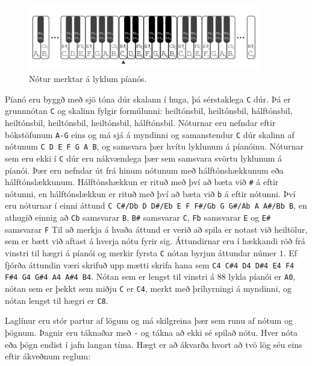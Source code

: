 \begin{figure}[ht!]
  \centering
    \includegraphics[width=0.9\textwidth]{piano}
  \caption{Nótur merktar á lyklum píanós.}
\end{figure}

Píanó eru byggð með sjö tóna dúr skalann í huga, þá sérstaklega \texttt{C} dúr.
Þá er grunnnótan \texttt{C} og skalinn fylgir formúlunni:
heiltónsbil, heiltónsbil, hálftónsbil, heiltónsbil, heiltónsbil, heiltónsbil, hálftónsbil.
Nóturnar eru nefndar eftir bókstöfunum \texttt{A-G} eins og má sjá á myndinni og samanstendur \texttt{C} dúr skalinn af nótunum \texttt{C D E F G A B}, og samsvara þær hvítu lyklunum á píanóinu.
Nóturnar sem eru ekki í \texttt{C} dúr eru nákvæmlega þær sem samsvara svörtu lyklunum á píanói.
Þær eru nefndar út frá hinum nótunum með hálftónshækkunum eða hálftónslækkunum.
Hálftónshækkun er rituð með því að bæta við \texttt{\#} á eftir nótunni, en hálftónslækkun er rituð með því að bæta við \texttt{b} á eftir nótunni.
Því eru nóturnar í einni áttund \texttt{C C\#/Db D D\#/Eb E F F\#/Gb G G\#/Ab A A\#/Bb B}, en athugið einnig að \texttt{Cb} samsvarar \texttt{B}, \texttt{B\#} samsvarar \texttt{C}, \texttt{Fb} samsvarar \texttt{E} og \texttt{E\#} samsvarar \texttt{F}
Til að merkja á hvaða áttund er verið að spila er notast við heiltölur, sem er bætt við aftast á hverja nótu fyrir sig.
Áttundirnar eru í hækkandi röð frá vinstri til hægri á píanói og merkir fyrsta \texttt{C} nótan byrjun áttundar númer $1$.
Ef fjórða áttundin væri skrifuð upp mætti skrifa hana sem \texttt{C4 C\#4 D4 D\#4 E4 F4 F\#4 G4 G\#4 A4 A\#4 B4}.
Nótan sem er lengst til vinstri á $88$ lykla píanói er \texttt{A0}, nótan sem er þekkt sem miðju \texttt{C} er \texttt{C4}, merkt með þríhyrningi á myndinni, og nótan lengst til hægri er \texttt{C8}.

Laglínur eru stór partur af lögum og má skilgreina þær sem runu af nótum og þögnum.
Þagnir eru táknaðar með \texttt{-} og tákna að ekki sé spilað nótu.
Hver nóta eða þögn endist í jafn langan tíma.
Hægt er að ákvarða hvort að tvö lög séu eins eftir ákveðnum reglum:

